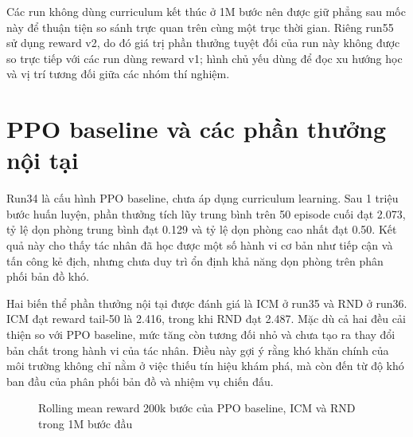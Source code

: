 Các run không dùng curriculum kết thúc ở 1M bước nên được giữ phẳng sau mốc này để thuận tiện so sánh trực quan trên cùng một trục thời gian. Riêng run55 sử dụng reward v2, do đó giá trị phần thưởng tuyệt đối của run này không được so trực tiếp với các run dùng reward v1; hình chủ yếu dùng để đọc xu hướng học và vị trí tương đối giữa các nhóm thí nghiệm.

\section{PPO baseline và các phần thưởng nội tại}

Run34 là cấu hình PPO baseline, chưa áp dụng curriculum learning. Sau 1 triệu bước huấn luyện, phần thưởng tích lũy trung bình trên 50 episode cuối đạt 2.073, tỷ lệ dọn phòng trung bình đạt 0.129 và tỷ lệ dọn phòng cao nhất đạt 0.50. Kết quả này cho thấy tác nhân đã học được một số hành vi cơ bản như tiếp cận và tấn công kẻ địch, nhưng chưa duy trì ổn định khả năng dọn phòng trên phân phối bản đồ khó.

Hai biến thể phần thưởng nội tại được đánh giá là ICM ở run35 và RND ở run36. ICM đạt reward tail-50 là 2.416, trong khi RND đạt 2.487. Mặc dù cả hai đều cải thiện so với PPO baseline, mức tăng còn tương đối nhỏ và chưa tạo ra thay đổi bản chất trong hành vi của tác nhân. Điều này gợi ý rằng khó khăn chính của môi trường không chỉ nằm ở việc thiếu tín hiệu khám phá, mà còn đến từ độ khó ban đầu của phân phối bản đồ và nhiệm vụ chiến đấu.

\begin{figure}[H]
    \centering
    \caption{Rolling mean reward 200k bước của PPO baseline, ICM và RND trong 1M bước đầu}
    \label{fig:baseline_intrinsic_reward}
\end{figure}

